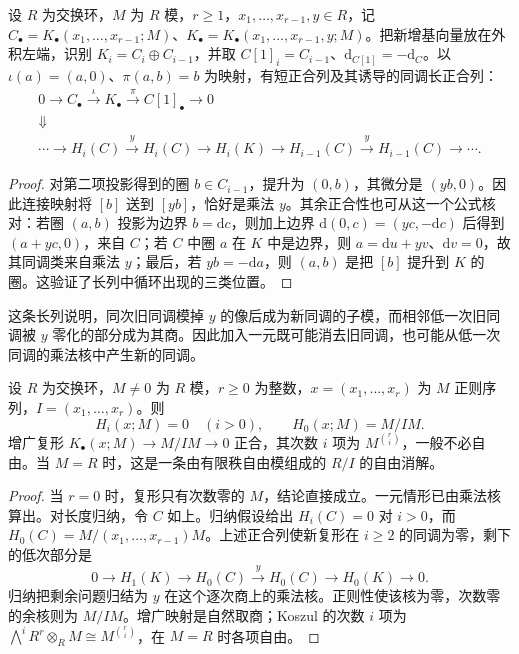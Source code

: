\begin{lemma}\label{b3:lem:koszul-adjoin-exact}
	设 \(R\) 为交换环，\(M\) 为 \(R\) 模，\(r\ge1\)，\(x_1,\ldots,x_{r-1},y\in R\)，记 \(C_\bullet=K_\bullet(x_1,\ldots,x_{r-1};M)\)、\(K_\bullet=K_\bullet(x_1,\ldots,x_{r-1},y;M)\)。把新增基向量放在外积左端，识别 \(K_i=C_i\oplus C_{i-1}\)，并取 \(C[1]_i=C_{i-1}\)、\(\mathrm{d}_{C[1]}=-\mathrm{d}_C\)。以 \(\iota(a)=(a,0)\)、\(\pi(a,b)=b\) 为映射，有短正合列及其诱导的同调长正合列：
	\[
		\begin{gathered}
			0\longrightarrow C_\bullet\xrightarrow{\iota}K_\bullet \xrightarrow{\pi}C[1]_\bullet\longrightarrow0
			\\
			\Downarrow
			\\
			\cdots\longrightarrow H_i(C)\xrightarrow{y}H_i(C) \longrightarrow H_i(K) \longrightarrow H_{i-1}(C)\xrightarrow{y}H_{i-1}(C)\longrightarrow\cdots.
		\end{gathered}
	\]
\end{lemma}
\begin{proof}
	对第二项投影得到的圈 \(b\in C_{i-1}\)，提升为 \((0,b)\)，其微分是 \((yb,0)\)。因此连接映射将 \([b]\) 送到 \([yb]\)，恰好是乘法 \(y\)。其余正合性也可从这一个公式核对：若圈 \((a,b)\) 投影为边界 \(b=\mathrm{d}c\)，则加上边界 \(\mathrm{d}(0,c)=(yc,-\mathrm{d}c)\) 后得到 \((a+yc,0)\)，来自 \(C\)；若 \(C\) 中圈 \(a\) 在 \(K\) 中是边界，则 \(a=\mathrm{d}u+yv\)、\(\mathrm{d}v=0\)，故其同调类来自乘法 \(y\)；最后，若 \(yb=-\mathrm{d}a\)，则 \((a,b)\) 是把 \([b]\) 提升到 \(K\) 的圈。这验证了长列中循环出现的三类位置。
\end{proof}

这条长列说明，同次旧同调模掉 \(y\) 的像后成为新同调的子模，而相邻低一次旧同调被 \(y\) 零化的部分成为其商。因此加入一元既可能消去旧同调，也可能从低一次同调的乘法核中产生新的同调。

\begin{theorem}\label{b3:thm:koszul-regular-resolution}
	设 \(R\) 为交换环，\(M\ne0\) 为 \(R\) 模，\(r\ge0\) 为整数，\(x=(x_1,\ldots,x_r)\) 为 \(M\) 正则序列，\(I=(x_1,\ldots,x_r)\)。则
	\[
		H_i(x;M)=0\quad(i>0),\qquad H_0(x;M)=M/IM.
	\]
	增广复形 \(K_\bullet(x;M)\rightarrow M/IM\rightarrow0\) 正合，其次数 \(i\) 项为 \(M^{\binom ri}\)，一般不必自由。当 \(M=R\) 时，这是一条由有限秩自由模组成的 \(R/I\) 的自由消解。
\end{theorem}
\begin{proof}
	当 \(r=0\) 时，复形只有次数零的 \(M\)，结论直接成立。一元情形已由乘法核算出。对长度归纳，令 \(C\) 如上。归纳假设给出 \(H_i(C)=0\) 对 \(i>0\)，而 \(H_0(C)=M/(x_1,\ldots,x_{r-1})M\)。上述正合列使新复形在 \(i\ge2\) 的同调为零，剩下的低次部分是
	\[
		0\longrightarrow H_1(K)\longrightarrow H_0(C)\xrightarrow{y}H_0(C) \longrightarrow H_0(K)\longrightarrow0.
	\]
	归纳把剩余问题归结为 \(y\) 在这个逐次商上的乘法核。正则性使该核为零，次数零的余核则为 \(M/IM\)。增广映射是自然取商；Koszul 的次数 \(i\) 项为 \(\bigwedge^iR^r\otimes_RM\cong M^{\binom ri}\)，在 \(M=R\) 时各项自由。
\end{proof}

